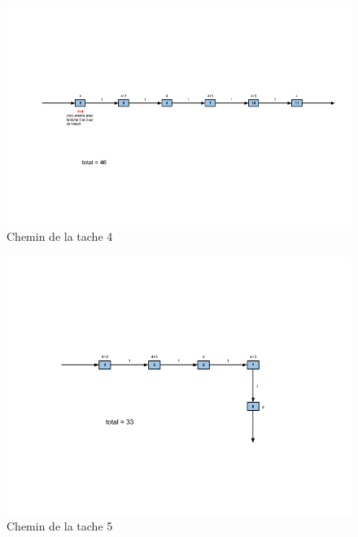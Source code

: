 \documentclass[a4paper,10pt]{article}
\newenvironment{figureH} {%
\begin{figure}[H]
}{%
\end{figure}
}
\begin{document}
      \begin{figureH}
        \includegraphics[width=\textwidth]{images/tache4.png}
        \center
        \caption{Chemin de la tache 4}
        \label{image_global}
    \end{figureH}
     \begin{figureH}
        \includegraphics[width=\textwidth]{images/tache5.png}
        \center
        \caption{Chemin de la tache 5}
        \label{image_global}
    \end{figureH}
\end{document}
